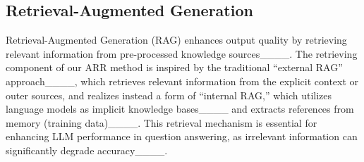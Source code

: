 \subsection{Retrieval-Augmented Generation}

Retrieval-Augmented Generation (RAG) enhances output quality by retrieving relevant information from pre-processed knowledge sources____.
The retrieving component of our ARR method is inspired by the traditional ``external RAG'' approach____, which retrieves relevant information from the explicit context or outer sources, and realizes instead a form of ``internal RAG,'' which utilizes language models as implicit knowledge bases____ and extracts references from memory (training data)____.
This retrieval mechanism is essential for enhancing LLM performance in question answering, as irrelevant information can significantly degrade accuracy____.



%